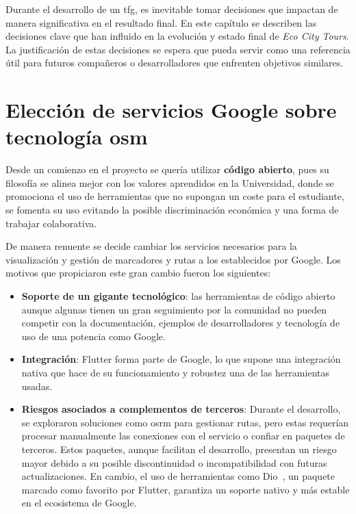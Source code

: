 
Durante el desarrollo de un \acrlong{tfg}, es inevitable tomar decisiones que impactan de manera significativa en el resultado final. En este capítulo se describen las decisiones clave que han influido en la evolución y estado final de \textit{Eco City Tours}. La justificación de estas decisiones se espera que pueda servir como una referencia útil para futuros compañeros o desarrolladores que enfrenten objetivos similares. 

\section{Elección de servicios Google sobre tecnología \acrlong{osm}}

Desde un comienzo en el proyecto se quería utilizar \textbf{código abierto}, pues su filosofía se alinea mejor con los valores aprendidos en la Universidad, donde se promociona el uso de herramientas que no supongan un coste para el estudiante, se fomenta su uso evitando la posible discriminación económica y una forma de trabajar colaborativa.

De manera renuente se decide cambiar los servicios necesarios para la visualización y gestión de marcadores y rutas a los establecidos por Google. Los motivos que propiciaron este gran cambio fueron los siguientes:
\begin{itemize}
	\item \textbf{Soporte de un gigante tecnológico}: las herramientas de código abierto aunque algunas tienen un gran seguimiento por la comunidad no pueden competir con la documentación, ejemplos de desarrolladores y tecnología de uso de una potencia como Google.
	\item \textbf{Integración}: Flutter forma parte de Google, lo que supone una integración nativa que hace de su funcionamiento y robustez una de las herramientas usadas.
	\item \textbf{Riesgos asociados a complementos de terceros}: Durante el desarrollo, se exploraron soluciones como \acrfull{osrm} para gestionar rutas, pero estas requerían procesar manualmente las conexiones con el servicio o confiar en paquetes de terceros. Estos paquetes, aunque facilitan el desarrollo, presentan un riesgo mayor debido a su posible discontinuidad o incompatibilidad con futuras actualizaciones. En cambio, el uso de herramientas como Dio~\cite{dio_package}, un paquete marcado como favorito por Flutter, garantiza un soporte nativo y más estable en el ecosistema de Google.
\end{itemize} 

